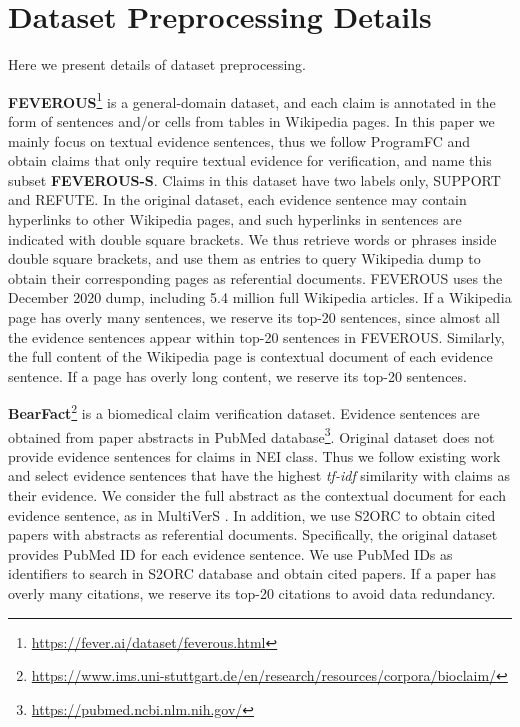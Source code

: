 \section{Dataset Preprocessing Details}
\label{sec:dataset_preprocessing}

Here we present details of dataset preprocessing.

\textbf{FEVEROUS}\footnote{\url{https://fever.ai/dataset/feverous.html}} \cite{feverous} is a general-domain dataset, and each claim is annotated in the form of sentences and/or cells from tables in Wikipedia pages. In this paper we mainly focus on textual evidence sentences, thus we follow ProgramFC \cite{programfc} and obtain claims that only require textual evidence for verification, and name this subset \textbf{FEVEROUS-S}. Claims in this dataset have two labels only, SUPPORT and REFUTE. In the original dataset, each evidence sentence may contain hyperlinks to other Wikipedia pages, and such hyperlinks in sentences are indicated with double square brackets. We thus retrieve words or phrases inside double square brackets, and use them as entries to query Wikipedia dump to obtain their corresponding pages as referential documents. FEVEROUS uses the December 2020 dump, including 5.4 million full Wikipedia articles. If a Wikipedia page has overly many sentences, we reserve its top-20 sentences, since almost all the evidence sentences appear within top-20 sentences in FEVEROUS. Similarly, the full content of the Wikipedia page is contextual document of each evidence sentence. If a page has overly long content, we reserve its top-20 sentences.

\textbf{BearFact}\footnote{\url{https://www.ims.uni-stuttgart.de/en/research/resources/corpora/bioclaim/}} \cite{bear_fact} is a biomedical claim verification dataset. Evidence sentences are obtained from paper abstracts in PubMed database\footnote{\url{https://pubmed.ncbi.nlm.nih.gov/}}. Original dataset does not provide evidence sentences for claims in NEI class. Thus we follow existing work \cite{protoco} and select evidence sentences that have the highest \textit{tf-idf} similarity with claims as their evidence. We consider the full abstract as the contextual document for each evidence sentence, as in MultiVerS \cite{multivers}. In addition, we use S2ORC \cite{s2orc} to obtain cited papers with abstracts as referential documents. Specifically, the original dataset provides PubMed ID for each evidence sentence. We use PubMed IDs as identifiers to search in S2ORC database and obtain cited papers. If a paper has overly many citations, we reserve its top-20 citations to avoid data redundancy.

